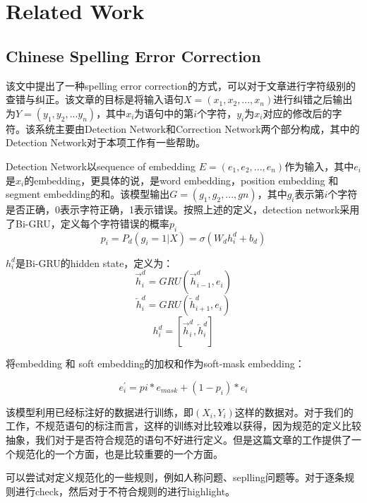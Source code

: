 \documentclass[UTF8]{ctexart}
\numberwithin{equation}{section}
\begin{document}
\section{Related Work}
\subsection{Chinese Spelling Error Correction}
该文中提出了一种spelling error correction的方式，可以对于文章进行字符级别的查错与纠正。该文章的目标是将输入语句$X=(x_{1},x_{2},...,x_{n})$进行纠错之后输出为$Y=(y_{1},y_{2},...y_{n})$，其中$x_{i}$为语句中的第$i$个字符，$y_{i}$为$x_{i}$对应的修改后的字符。该系统主要由Detection Network和Correction Network两个部分构成，其中的Detection Network对于本项工作有一些帮助。

Detection Network以sequence of embedding  $E=(e_{1},e_{2},...,e_{n})$作为输入，其中$e_{i}$是$x_{i}$的embedding，更具体的说，是word embedding，position embedding 和 segment embedding的和。该模型输出$G=(g_{1},g_{2},...,g{n})$，其中$g_{i}$表示第$i$个字符是否正确，0表示字符正确，1表示错误。按照上述的定义，detection network采用了Bi-GRU，定义每个字符错误的概率$p_{i}$
\begin{equation}
p_{i}=P_{d}(g_{i}=1|X)=\sigma(W_{d}h_{i}^{d}+b_{d})
\end{equation}

$h_{i}^{d}$是Bi-GRU的hidden state，定义为：
\begin{equation}
\overrightarrow{h}_{i}^{d}=GRU(\overrightarrow{h}_{i-1}^{d},e_{i})
\end{equation}
\begin{equation}
\overleftarrow{h}_{i}^{d}=GRU(\overleftarrow{h}_{i+1}^{d},e_{i})
\end{equation}
\begin{equation}
h_{i}^{d}=\left [\overrightarrow{h}_{i}^{d},  \overleftarrow{h}_{i}^{d} \right ]
\end{equation}

将embedding 和 soft embedding的加权和作为soft-mask embedding：

\begin{equation}
e_{i}^{'}=p{i}*e_{mask}+(1-p_{i})*e_{i}
\end{equation}

该模型利用已经标注好的数据进行训练，即$(X_{i},Y_{i})$这样的数据对。对于我们的工作，不规范语句的标注而言，这样的训练对比较难以获得，因为规范的定义比较抽象，我们对于是否符合规范的语句不好进行定义。但是这篇文章的工作提供了一个规范化的一个方面，也是比较重要的一个方面。

可以尝试对定义规范化的一些规则，例如人称问题、seplling问题等。对于逐条规则进行check，然后对于不符合规则的进行highlight。
\end{document}
